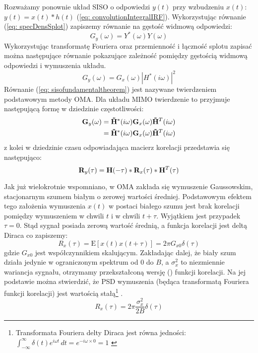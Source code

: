 Rozważamy ponownie układ SISO o odpowiedzi $y(t)$ przy wzbudzeniu $x(t)$: $y(t)=x(t)*h(t)$ (\ref{eq: convolutionIntegralIRF}). Wykorzystując równanie (\ref{eq: specDensSplot}) zapiszemy równanie na gęstość widmową odpowiedzi:
\begin{equation} \label{g}
	G_{y}(\omega) = Y^*(\omega)Y(\omega)
\end{equation}
Wykorzystując transformatę Fouriera oraz przemienność i łączność splotu zapisać można następujące równanie pokazujące zależność pomiędzy gęstością widmową odpowiedzi i wymuszenia układu.
\begin{equation} \label{eq: sisofundamentaltheorem}
	G_{y}(\omega) = G_x(\omega)|H^*(i\omega)|^2
\end{equation}
Równanie (\ref{eq: sisofundamentaltheorem}) jest nazywane twierdzeniem podstawowym  metody OMA. Dla układu MIMO twierdzenie to przyjmuje następującą formę w dziedzinie częstotliwości:
\begin{equation} \label{eq: matrixoutputspectraldensity}
	\begin{split}
	\mathbf{G}_{y}(\omega) &=\mathbf{\tilde{H}}^*(i\omega)\mathbf{G}_x(\omega)\mathbf{\tilde{H}}^T(i\omega)\\
	&=\mathbf{\tilde{H}}^*(i\omega)\mathbf{G}_x(\omega)\mathbf{\tilde{H}}^T(i\omega)
	\end{split}
\end{equation}
z kolei w dziedzinie czasu odpowiadająca macierz korelacji przedstawia się następująco:
\begin{equation} \label{eq: matrixoutputcorrelation}
		\mathbf{R}_y(\tau)=\mathbf{H}(-\tau)*\mathbf{R}_x(\tau)*\mathbf{H}^T(\tau)
\end{equation}

Jak już wielokrotnie wspomniano, w OMA zakłada się wymuszenie Gaussowskim, stacjonarnym szumem białym o zerowej wartości średniej. Podstawowym efektem tego założenia wymuszenia $x(t)$ w postaci białego szumu jest brak korelacji pomiędzy wymuszeniem w chwili $t$ i w chwili $t+\tau$. Wyjątkiem jest przypadek $\tau=0$. Stąd sygnał posiada zerową wartość średnią, a funkcja korelacji jest deltą Diraca co zapiszemy:
\begin{equation}
	R_x(\tau)=\mathrm{E}[x(t)x(t+\tau)] = 2\pi G_{x0} \delta(\tau)
\end{equation} 
gdzie $G_{x0}$ jest współczynnikiem skalującym. Zakładając dalej, że biały szum działa jedynie w ograniczonym spektrum od $0$ do $B$, a $\sigma_x^2$ to niezmiennie wariancja sygnału, otrzymamy przekształconą wersję () funkcji korelacji. Na jej podstawie można stwierdzić, że PSD wymuszenia (będąca transformatą Fouriera funkcji korelacji) jest wartością stałą\footnote{Transformata Fouriera delty Diraca jest równa jedności: $\int_{-\infty}^{\infty} \delta(t) e^{i\omega t}\,dt = e^{-i\omega\times 0}=1$ \parencite{Zielinski2002}} .
\begin{equation} \label{eq: whitenoisecorrelationSISO}
	R_x(\tau)=2\pi \frac{\sigma_x^2}{2B} \delta(\tau)
\end{equation} 

